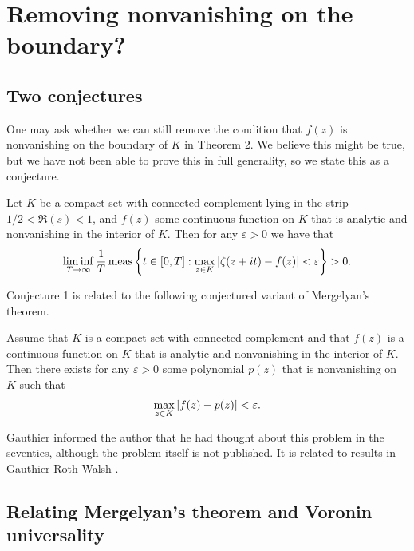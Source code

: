 \documentclass[11pt]{article}
\begin{document}
\section{Removing nonvanishing on the boundary?}

\subsection{Two conjectures}
 One may ask whether we can still remove the condition that $f(z)$ is nonvanishing on the boundary of $K$ in Theorem 2.  We believe this might be true, but we have not been able to prove this in full generality, so we state this as a conjecture.
\begin{conj} Let $K$ be a compact set with connected complement lying in the strip $1/2<\Re(s)<1$, and  $f(z)$  some continuous function on $K$ that is analytic and nonvanishing in the interior of $K$. Then for any $\varepsilon>0$ we have that
$$\liminf_{T \to \infty} \frac 1 T \mathop{\rm meas} \left \{t \in [0,T]:\max_{z \in K} {\left| {\zeta(z+it)-f(z)} \right|}<\varepsilon \right \}>0. $$
\end{conj}
Conjecture 1 is related to the following conjectured variant of Mergelyan's theorem.
\begin{conj}  
  Assume that $K$ is a compact set with connected complement and that $f(z)$ is a continuous function on $K$  that is analytic and nonvanishing in the interior of $K$. Then there exists for any $\varepsilon>0$ some polynomial $p(z)$ that is nonvanishing on $K$ such that
\begin{gather*}
 \max_{z \in K}{\left| {f(z)-p(z)} \right|}<\varepsilon.
\end{gather*}
\end{conj}
\begin{rem} Gauthier informed the author that he had thought about this problem in the seventies, although the problem itself is not published. It is related to  results in Gauthier-Roth-Walsh \cite{GauthierRothWalsh}.
\end{rem}


\subsection{Relating Mergelyan's theorem and Voronin universality}
\end{document}
